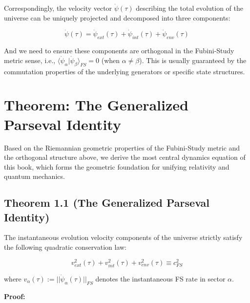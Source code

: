 \documentclass[11pt,a4paper,twoside]{book}
\begin{document}
Correspondingly, the velocity vector \textbf{$\dot{\psi}(\tau)$} describing the total evolution of the universe can be uniquely projected and decomposed into three components:

$$\dot{\psi}(\tau) = \dot{\psi}_{ext}(\tau) + \dot{\psi}_{int}(\tau) + \dot{\psi}_{env}(\tau)$$

And we need to ensure these components are orthogonal in the Fubini-Study metric sense, i.e., \textbf{$\langle \dot{\psi}_{\alpha} | \dot{\psi}_{\beta} \rangle_{FS} = 0$} (when \textbf{$\alpha \neq \beta$}). This is usually guaranteed by the commutation properties of the underlying generators or specific state structures.

\section{Theorem: The Generalized Parseval Identity}

Based on the Riemannian geometric properties of the Fubini-Study metric and the orthogonal structure above, we derive the most central dynamics equation of this book, which forms the geometric foundation for unifying relativity and quantum mechanics.

\subsection{Theorem 1.1 (The Generalized Parseval Identity)}

The instantaneous evolution velocity components of the universe strictly satisfy the following quadratic conservation law:

$$v_{ext}^2(\tau) + v_{int}^2(\tau) + v_{env}^2(\tau) \equiv c_{FS}^2$$

where \textbf{$v_{\alpha}(\tau) := ||\dot{\psi}_{\alpha}(\tau)||_{FS}$} denotes the instantaneous FS rate in sector \textbf{$\alpha$}.

\textbf{Proof:}
\end{document}
